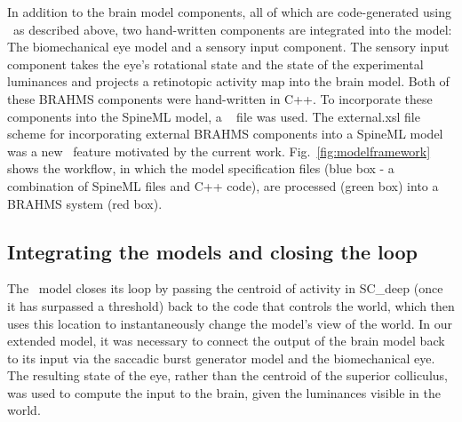 \documentclass{frontiersSCNS}
\begin{document}
In addition to the brain model components, all of which are
code-generated using \stob~as described above, two hand-written
components are integrated into the model: The biomechanical eye model
and a sensory input component. The sensory input component takes the
eye's rotational state and the state of the experimental luminances
and projects a retinotopic activity map into the brain model. Both of
these BRAHMS components were hand-written in C++. To incorporate these
components into the SpineML model, a \stob~ file was
used.  The external.xsl file scheme for incorporating external BRAHMS
components into a SpineML model was a new \stob~feature motivated by
the current work.  Fig.~\ref{fig:modelframework} shows the workflow, in
which the model specification files (blue box - a combination of
SpineML files and C++ code), are processed (green box) into a BRAHMS
system (red box).

\subsection{Integrating the models and closing the loop}
\label{sec:methods:integrating}

The \ccg~model closes its loop by passing the centroid of activity in
SC\_deep (once it has surpassed a threshold) back to the code that
controls the world, which then uses this location to
instantaneously change the model's view of the world. In our extended
model, it was necessary to connect the output of the brain model back
to its input via the saccadic burst generator model and the
biomechanical eye. The resulting state of the eye, rather than the
centroid of the superior colliculus, was used to compute the input to
the brain, given the luminances visible in the world.

\end{document}
